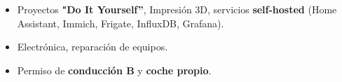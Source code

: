 \documentclass[10pt,a4paper,ragged2e,withhyper]{altacv}
\begin{document}
\begin{paracol}{2}

\begin{itemize}
    \setlength{\itemindent}{0.5em}
    \item Proyectos \textbf{"Do It Yourself”}, Impresión 3D, servicios \textbf{self-hosted} (Home Assistant, Immich, Frigate, InfluxDB, Grafana).
    \item Electrónica, reparación de equipos.
    \item Permiso de \textbf{conducción B} y \textbf{coche propio}.
\end{itemize}












\end{paracol}
\end{document}
